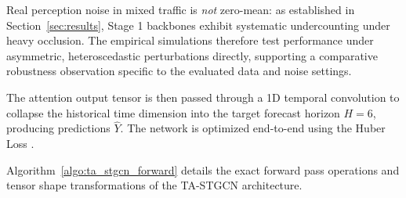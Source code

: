 \documentclass[journal,twocolumn]{IEEEtran}
\begin{document}
Real perception noise in mixed traffic is \emph{not} zero-mean: as established in Section~\ref{sec:results}, Stage 1 backbones exhibit systematic undercounting under heavy occlusion. The empirical simulations therefore test performance under asymmetric, heteroscedastic perturbations directly, supporting a comparative robustness observation specific to the evaluated data and noise settings.

The attention output tensor is then passed through a 1D temporal convolution to collapse the historical time dimension into the target forecast horizon $H=6$, producing predictions $\hat{Y}$. The network is optimized end-to-end using the Huber Loss \cite{huber}.

Algorithm~\ref{algo:ta_stgcn_forward} details the exact forward pass operations and tensor shape transformations of the TA-STGCN architecture.
\end{document}
